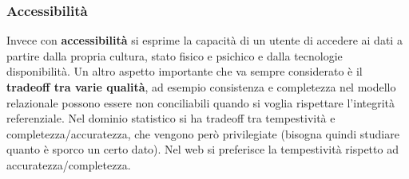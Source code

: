 \subsubsection{Accessibilità}

Invece con \textbf{accessibilità} si esprime la capacità di un utente di accedere ai dati a partire dalla propria cultura, stato fisico e psichico e dalla tecnologie disponibilità. Un altro aspetto importante che va sempre considerato è il \textbf{tradeoff tra varie qualità}, ad esempio consistenza e completezza nel modello relazionale possono essere non conciliabili quando si voglia rispettare l'integrità referenziale. Nel dominio statistico si ha tradeoff tra tempestività e completezza/accuratezza, che vengono però privilegiate (bisogna quindi studiare quanto è sporco un certo dato). Nel web si preferisce la tempestività rispetto ad accuratezza/completezza.